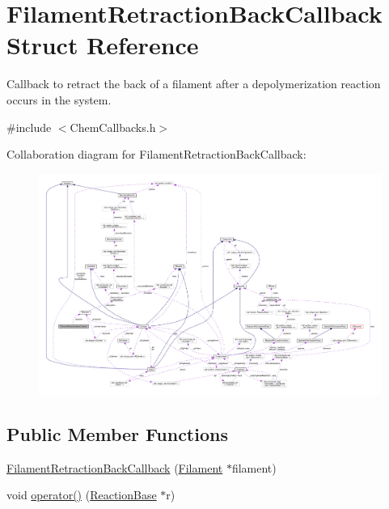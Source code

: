 \hypertarget{structFilamentRetractionBackCallback}{\section{Filament\+Retraction\+Back\+Callback Struct Reference}
\label{structFilamentRetractionBackCallback}
}


Callback to retract the back of a filament after a depolymerization reaction occurs in the system.  




{\ttfamily \#include $<$Chem\+Callbacks.\+h$>$}



Collaboration diagram for Filament\+Retraction\+Back\+Callback\+:\nopagebreak
\begin{figure}[H]
\begin{center}
\leavevmode
\includegraphics[width=350pt]{structFilamentRetractionBackCallback__coll__graph}
\end{center}
\end{figure}
\subsection*{Public Member Functions}
\begin{DoxyCompactItemize}
\item 
\hyperlink{structFilamentRetractionBackCallback_a2c399ba7ead0c7adfa8823ff36ba1c2c}{Filament\+Retraction\+Back\+Callback} (\hyperlink{classFilament}{Filament} $\ast$filament)
\item 
void \hyperlink{structFilamentRetractionBackCallback_a73f635852200f930ac3829085fcd76db}{operator()} (\hyperlink{classReactionBase}{Reaction\+Base} $\ast$r)
\end{DoxyCompactItemize}
